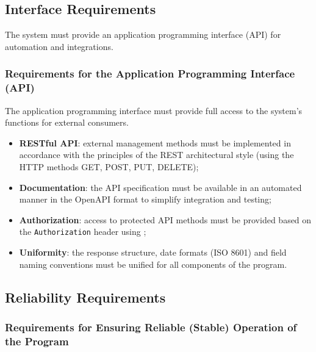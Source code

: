 \documentclass[12pt,a4paper]{extarticle}
\begin{document}
\subsection{Interface Requirements}
\label{sec:interface_reqs}

\begin{hseExample}
The system must provide an application programming interface (API) for automation and integrations.
\end{hseExample}

\subsubsection{Requirements for the Application Programming Interface (API)}

\begin{hseExample}
The application programming interface must provide full access to the system's functions for external consumers.
\begin{itemize}[nosep, leftmargin=1.25cm]
    \item \textbf{RESTful API}: external management methods must be implemented in accordance with the principles of the REST architectural style (using the HTTP methods GET, POST, PUT, DELETE);
    \item \textbf{Documentation}: the API specification must be available in an automated manner in the OpenAPI format to simplify integration and testing;
    \item \textbf{Authorization}: access to protected API methods must be provided based on the \texttt{Authorization} header using ;
    \item \textbf{Uniformity}: the response structure, date formats (ISO 8601) and field naming conventions must be unified for all components of the program.
\end{itemize}
\end{hseExample}

\subsection{Reliability Requirements}

\subsubsection{Requirements for Ensuring Reliable (Stable) Operation of the Program}
\end{document}
